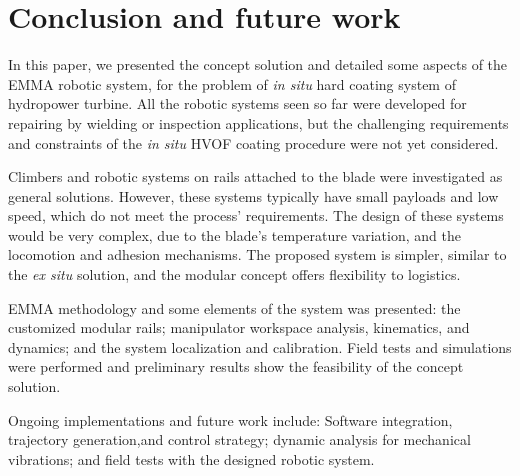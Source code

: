 \section{Conclusion and future work}

In this paper, we presented the concept solution and detailed some
aspects of the EMMA robotic system, for the problem of \textit{in situ} hard
coating system of hydropower turbine. All the robotic systems seen so far were
developed for repairing by wielding or inspection applications, but the
challenging requirements and constraints of the \textit{in situ} HVOF coating
procedure were not yet considered.

Climbers and robotic systems on rails attached to the blade were investigated as
general solutions. However, these systems typically have small payloads and
low speed, which do not meet the process' requirements. The design of these systems
would be very complex, due to the blade's temperature variation, and the
locomotion and adhesion mechanisms. The proposed system is simpler, similar to
the \textit{ex situ} solution, and the modular concept offers flexibility to
logistics.

EMMA methodology and some elements of the system was presented: the customized
modular rails; manipulator workspace analysis, kinematics, and dynamics; and
the system localization and calibration. Field tests and simulations were
performed and preliminary results show the feasibility of the concept solution.

Ongoing implementations and future work include: Software integration,
trajectory generation,and control strategy; dynamic analysis for mechanical
vibrations; and field tests with the designed robotic system.